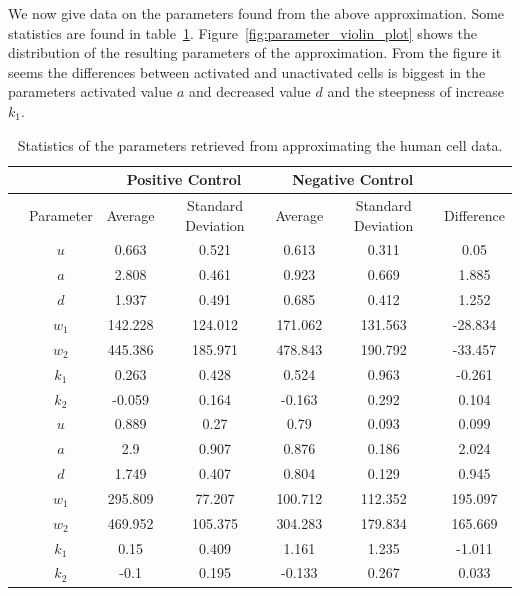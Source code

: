 We now give data on the parameters found from the above approximation. Some statistics are found in table~\ref{tab:statistics_parameters}. Figure~\ref{fig:parameter_violin_plot} shows the distribution of the resulting parameters of the approximation. From the figure it seems the differences between activated and unactivated cells is biggest in the parameters activated value $a$ and decreased value $d$ and the steepness of increase $k_1$.

\begin{table}[h!]
	\centering
	\begin{tabular}{|c|c|c|c|c|c|c|}
		\hline
		 & & \multicolumn{2}{|c|}{Positive Control} & \multicolumn{2}{|c|}{Negative Control} & \\ 
		\hline
		& Parameter & Average & Standard Deviation & Average & Standard Deviation & Difference \\ 
		\hline
		\multirow{7}{*}{\rotatebox[origin=c]{90}{human cells}} & $u$ & 0.663 & 0.521 & 0.613 & 0.311 & 0.05\\
		\cline{2-7}
		& $a$ & 2.808 & 0.461 & 0.923 & 0.669 & 1.885\\
		\cline{2-7}
		& $d$ & 1.937 & 0.491 & 0.685 & 0.412 & 1.252\\
		\cline{2-7}
		& $w_1$ & 142.228 & 124.012 & 171.062 & 131.563 & -28.834 \\
		\cline{2-7}
		& $w_2$ & 445.386 & 185.971 & 478.843 & 190.792 & -33.457 \\
		\cline{2-7}
		& $k_1$ & 0.263 & 0.428 & 0.524 & 0.963 & -0.261 \\
		\cline{2-7}
		& $k_2$ & -0.059 & 0.164 & -0.163 & 0.292 & 0.104 \\
		\hline
		\multirow{7}{*}{\rotatebox[origin=c]{90}{mouse cells}} & $u$ & 0.889 & 0.27 & 0.79 & 0.093 & 0.099 \\
		\cline{2-7}
		& $a$ & 2.9 & 0.907 & 0.876 & 0.186 & 2.024 \\
		\cline{2-7}
		& $d$ & 1.749 & 0.407 & 0.804 & 0.129 & 0.945 \\
		\cline{2-7}
		& $w_1$ & 295.809 & 77.207 & 100.712 & 112.352 & 195.097 \\
		\cline{2-7}
		& $w_2$ & 469.952 & 105.375 & 304.283 & 179.834 & 165.669 \\
		\cline{2-7}
		& $k_1$ & 0.15 & 0.409 & 1.161 & 1.235 & -1.011 \\
		\cline{2-7}
		& $k_2$ & -0.1 & 0.195 & -0.133 & 0.267 & 0.033 \\
		\hline
	\end{tabular}
	\label{tab:statistics_parameters}
	\caption{Statistics of the parameters retrieved from approximating the human cell data.}
\end{table}

